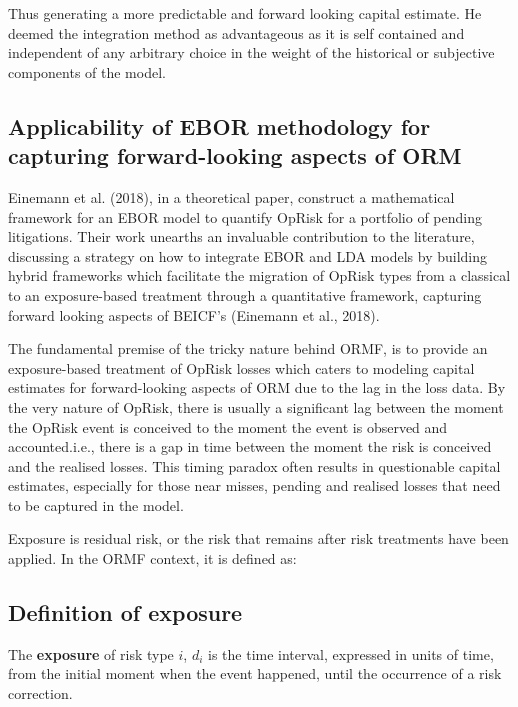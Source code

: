 \documentclass[]{DissertateUSU}
\begin{document}
Thus generating a more predictable and forward looking capital estimate.
He deemed the integration method as advantageous as it is self contained
and independent of any arbitrary choice in the weight of the historical
or subjective components of the model.

\subsection{Applicability of EBOR methodology for capturing forward-looking aspects of ORM}
\label{ssec:Applicability of EBOR methodology for capturing forward-looking aspects of ORM}

Einemann et al. (2018), in a theoretical paper, construct a mathematical
framework for an EBOR model to quantify OpRisk for a portfolio of
pending litigations. Their work unearths an invaluable contribution to
the literature, discussing a strategy on how to integrate EBOR and LDA
models by building hybrid frameworks which facilitate the migration of
OpRisk types from a classical to an exposure-based treatment through a
quantitative framework, capturing forward looking aspects of BEICF's
(Einemann et al., 2018).\medskip

The fundamental premise of the tricky nature behind ORMF, is to provide
an exposure-based treatment of OpRisk losses which caters to modeling
capital estimates for forward-looking aspects of ORM due to the lag in
the loss data. By the very nature of OpRisk, there is usually a
significant lag between the moment the OpRisk event is conceived to the
moment the event is observed and accounted.i.e., there is a gap in time
between the moment the risk is conceived and the realised losses. This
timing paradox often results in questionable capital estimates,
especially for those near misses, pending and realised losses that need
to be captured in the model.\medskip

Exposure is residual risk, or the risk that remains after risk
treatments have been applied. In the ORMF context, it is defined as:

\subsection{Definition of exposure}
\label{ssec:Definition of exposure}

The \textbf{exposure} of risk type \(i\), \(d_{i}\) is the time
interval, expressed in units of time, from the initial moment when the
event happened, until the occurrence of a risk correction.\medskip 
\end{document}
